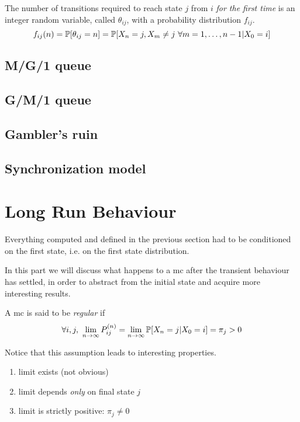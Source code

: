 \begin{definition} \label{def:first_passage_time}
	The number of transitions required to reach state $j$ from $i$ \emph{for the first time} is an integer random variable, called $\theta_{ij}$, with a probability distribution $f_{ij}$.
	\begin{equation*}
		f_{ij}(n)
			= \mathbb{P}[\theta_{ij} = n]
			= \mathbb{P}[X_n = j, X_m \neq j ~ \forall m = 1, \ldots, n-1 | X_0 = i]
	\end{equation*}
\end{definition}

\subsection{M/G/1 queue}
\subsection{G/M/1 queue}
\subsection{Gambler's ruin}
\subsection{Synchronization model}

\section{Long Run Behaviour}
Everything computed and defined in the previous section had to be conditioned on the first state, i.e. on the first state distribution.

In this part we will discuss what happens to a \gls{mc} after the transient behaviour has settled, in order to abstract from the initial state and acquire more interesting results.

\begin{definition}
	A \gls{mc} is said to be \emph{regular} if
	\begin{equation}
		\forall i, j, ~ \lim_{n \to \infty} P_{ij}^{(n)}
			= \lim_{ n \to \infty} \mathbb{P}[ X_n=j | X_0 =i]
			= \pi_j > 0
	\end{equation}
\end{definition}

Notice that this assumption leads to interesting properties.
\begin{enumerate}
	\item limit exists (not obvious)
	\item limit depends \emph{only} on final state $j$
	\item limit is strictly positive: $\pi_j \neq 0$
\end{enumerate}

